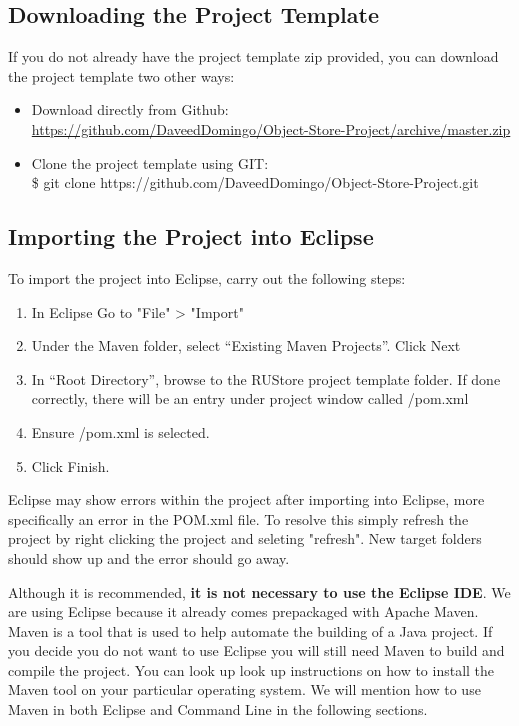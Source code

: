 \documentclass{article}
\begin{document}
\subsection{Downloading the Project Template}
If you do not already have the project template zip provided, you can download the project template two other ways:
\begin{itemize}
\item Download directly from Github:\\ \href{https://github.com/DaveedDomingo/Object-Store-Project/archive/master.zip}{https://github.com/DaveedDomingo/Object-Store-Project/archive/master.zip}
\item Clone the project template using GIT:\\ \$ git clone https://github.com/DaveedDomingo/Object-Store-Project.git
\end{itemize} 

\subsection{Importing the Project into Eclipse}
To import the project into Eclipse, carry out the following steps:
\begin{enumerate}
\item In Eclipse Go to "File" > "Import"
\item Under the Maven folder, select “Existing Maven Projects”. Click Next
\item In “Root Directory”, browse to the RUStore project template folder. If done correctly, there will be an entry under project window called /pom.xml
\item Ensure /pom.xml is selected. 
\item Click Finish.
\end{enumerate}
\begin{info}[Note:]
Eclipse may show errors within the project after importing into Eclipse, more specifically an error in the POM.xml file. To resolve this simply refresh the project by right clicking the project and seleting "refresh". New target folders should show up and the error should go away. 
\end{info}
\begin{info}
Although it is recommended, \textbf{it is not necessary to use the Eclipse IDE}. We are using Eclipse because it already comes prepackaged with Apache Maven. Maven is a tool that is used to help automate the building of a Java project. If you decide you do not want to use Eclipse you will still need Maven to build and compile the project. You can look up look up instructions on how to install the Maven tool on your particular operating system. We will mention how to use Maven in both Eclipse and Command Line in the following sections.
\end{info}
\end{document}
